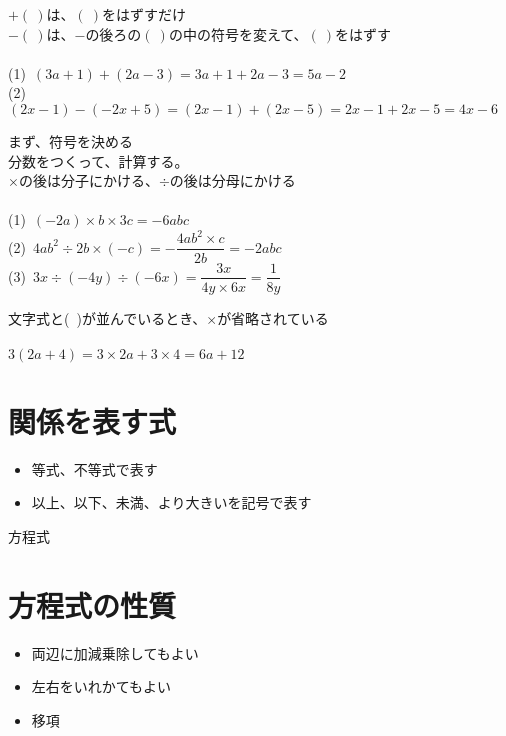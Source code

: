 \documentclass[11pt]{article}
\begin{document}
\begin{tcolorbox}[mybox={式の加減}]
$+(\ )$は、$(\ )$をはずすだけ\\
$-(\ )$は、$-$の後ろの$(\ )$の中の符号を変えて、$(\ )$をはずす\\

\\
(1)\ $(3a+1) + (2a-3) = 3a+1 + 2a-3 = 5a-2$\\
(2)\ $(2x-1) - (-2x+5) = (2x-1) + (2x-5) = 2x-1 + 2x-5 =4x -6$
\end{tcolorbox}

\begin{tcolorbox}[mybox={3つの乗除}]
まず、符号を決める\\
分数をつくって、計算する。\\
$\times$の後は分子にかける、$\div$の後は分母にかける\\

\\
(1)\ $(-2a) \times b \times 3c = -6abc$\\

(2)\ $4ab^2 \div 2 b  \times (-c) = - \dfrac{4ab^2 \times c}{2b} = -2abc$\\

(3)\ $3x \div (-4y) \div (-6x) = \dfrac{3x}{4y \times 6x} =\dfrac{1}{8y}$
\end{tcolorbox}

\begin{tcolorbox}[mybox={分配法則}]
文字式と(\ )が並んでいるとき、$\times$が省略されている\\

\\
$3(2a+4)=3 \times 2a + 3 \times 4 =6a+12$
\end{tcolorbox}


\section{関係を表す式}
\begin{itemize}
\item 等式、不等式で表す
\item 以上、以下、未満、より大きいを記号で表す
\end{itemize}

\newpage

{\LARGE \noindent 方程式}

\section{方程式の性質}
\begin{itemize}
\item 両辺に加減乗除してもよい
\item 左右をいれかてもよい
\item 移項
\end{itemize}
\end{document}
